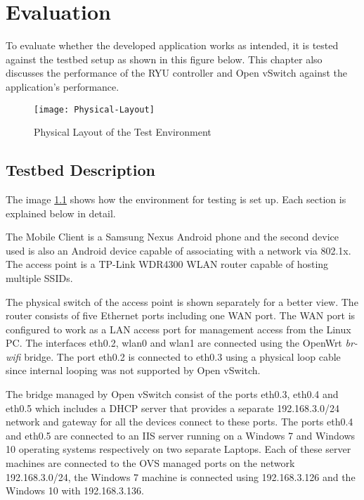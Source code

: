 \chapter{Evaluation}\label{ch:Evaluation}
To evaluate whether the developed application works as intended, it is tested against the testbed setup as shown in this figure below. This chapter also discusses the performance of the RYU controller and Open vSwitch against the application’s performance.

  \begin{figure}
	\centering
	\texttt{[image: Physical-Layout]}
	\caption {Physical Layout of the Test Environment}
	\label{fig:test-layout}
	\vspace{-10pt}
  \end{figure}

\section{Testbed Description}
The image \ref{fig:test-layout} shows how the environment for testing is set up. Each section is explained below in detail.

The Mobile Client is a Samsung Nexus Android phone and the second device used is also an Android device capable of associating with a network via 802.1x. The access point is a TP-Link WDR4300 WLAN router capable of hosting multiple SSIDs. 

The physical switch of the access point is shown separately for a better view. The router consists of five Ethernet ports including one WAN port. The WAN port is configured to work as a LAN access port for management access from the Linux PC. The interfaces eth0.2, wlan0 and wlan1 are connected using the OpenWrt \textit{br-wifi} bridge. The port eth0.2 is connected to eth0.3 using a physical loop cable since internal looping was not supported by Open vSwitch.

The bridge managed by Open vSwitch consist of the ports eth0.3, eth0.4 and eth0.5 which includes a DHCP server that provides a separate 192.168.3.0/24 network and gateway for all the devices connect to these ports. The ports eth0.4 and eth0.5 are connected to an IIS server running on a Windows 7 and Windows 10 operating systems respectively on two separate Laptops. Each of these server machines are connected to the OVS managed ports on the network 192.168.3.0/24, the Windows 7 machine is connected using 192.168.3.126 and the Windows 10 with 192.168.3.136.

